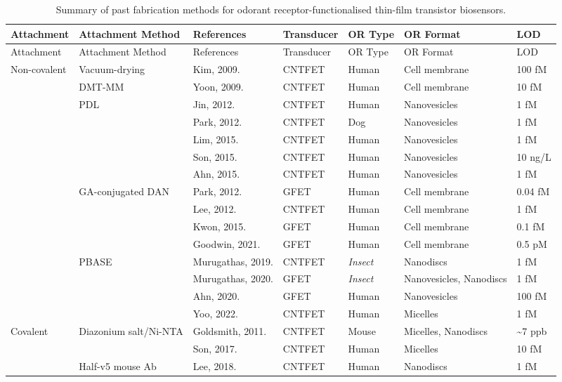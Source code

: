 \documentclass[
  a4paper,
]{scrbook}
\begin{document}
\begin{landscape}
\begin{center}

\hypertarget{tbl-or-biosensors}{}
\begin{longtable}[]{@{}lllllll@{}}
\caption{\label{tbl-or-biosensors}Summary of past fabrication methods
for odorant receptor-functionalised thin-film transistor
biosensors.}\tabularnewline
\toprule\noalign{}
Attachment & Attachment Method & References & Transducer & OR Type & OR
Format & LOD \\
\midrule\noalign{}
\endfirsthead
\toprule\noalign{}
Attachment & Attachment Method & References & Transducer & OR Type & OR
Format & LOD \\
\midrule\noalign{}
\endhead
\bottomrule\noalign{}
\endlastfoot
Non-covalent & Vacuum-drying & Kim, 2009. \cite{Kim2009a} & CNTFET &
Human & Cell membrane & 100 fM \\
& DMT-MM & Yoon, 2009. \cite{Yoon2009} & CNTFET & Human & Cell membrane
& 10 fM \\
& PDL & Jin, 2012. \cite{Jin2012} & CNTFET & Human & Nanovesicles & 1
fM \\
& & Park, 2012. \cite{Park2012a} & CNTFET & Dog & Nanovesicles & 1 fM \\
& & Lim, 2015. \cite{Lim2015} & CNTFET & Human & Nanovesicles & 1 fM \\
& & Son, 2015. \cite{Son2015} & CNTFET & Human & Nanovesicles & 10
ng/L \\
& & Ahn, 2015. \cite{Ahn2015} & CNTFET & Human & Nanovesicles & 1 fM \\
& GA-conjugated DAN & Park, 2012. \cite{Park2012} & GFET & Human & Cell
membrane & 0.04 fM \\
& & Lee, 2012. \cite{Lee2012b} & CNTFET & Human & Cell membrane & 1
fM \\
& & Kwon, 2015. \cite{Kwon2015} & GFET & Human & Cell membrane & 0.1
fM \\
& & Goodwin, 2021. \cite{Goodwin2021} & GFET & Human & Cell membrane &
0.5 pM \\
& PBASE & Murugathas, 2019. \cite{Murugathas2019a} & CNTFET &
\textit{Insect} & Nanodiscs & 1 fM \\
& & Murugathas, 2020. \cite{Murugathas2020} & GFET & \textit{Insect} &
Nanovesicles, Nanodiscs & 1 fM \\
& & Ahn, 2020. \cite{Ahn2020} & GFET & Human & Nanovesicles & 100 fM \\
& & Yoo, 2022. \cite{Yoo2022} & CNTFET & Human & Micelles & 1 fM \\
Covalent & Diazonium salt/Ni-NTA & Goldsmith, 2011. \cite{Goldsmith2011}
& CNTFET & Mouse & Micelles, Nanodiscs & \textasciitilde7 ppb \\
& & Son, 2017. \cite{Son2017} & CNTFET & Human & Micelles & 10 fM \\
& Half-v5 mouse Ab & Lee, 2018. \cite{Lee2018} & CNTFET & Human &
Nanodiscs & 1 fM \\
\end{longtable}

\end{center}
\end{landscape}
\restoregeometry %
\end{document}
